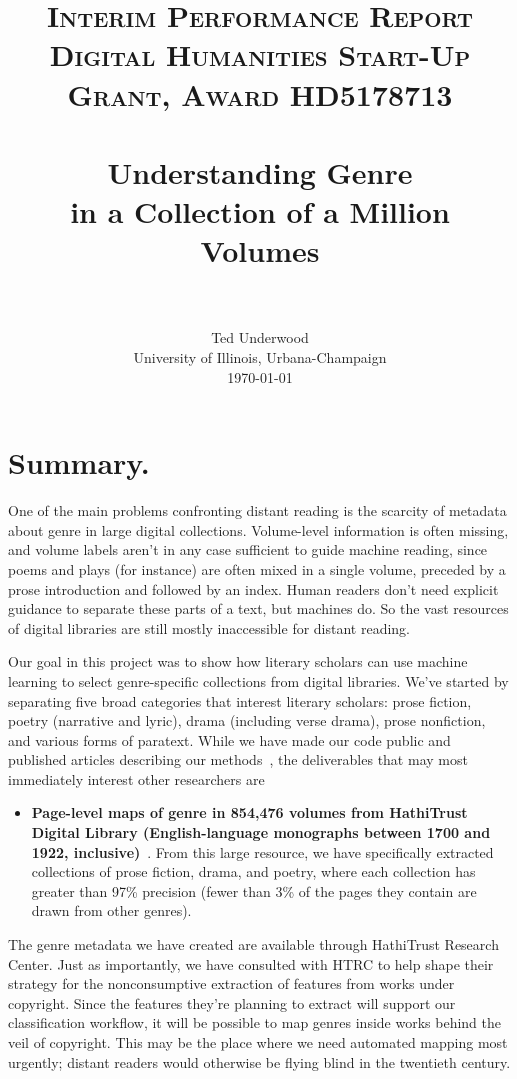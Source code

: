 \documentclass[paper=a4, fontsize=12pt]{scrartcl}
\title{
		\usefont{OT1}{bch}{b}{n}
		\normalfont \normalsize \textsc{Interim Performance Report\\Digital Humanities Start-Up Grant, Award HD5178713} \\ [25pt]
		\horrule{0.5pt} \\[0.4cm]
		\huge Understanding Genre\\in a Collection of a Million Volumes \\
		\horrule{2pt} \\[0.5cm]
}
\author{
        Ted Underwood\\University of Illinois, Urbana-Champaign\\	
        \today
}
\date{}
\numberwithin{equation}{section}		%
\numberwithin{figure}{section}			%
\numberwithin{table}{section}				%
\begin{document}
\maketitle
\thispagestyle{empty}
\newpage
\setcounter{page}{1}
\normalsize
{}
\tableofcontents
\newpage
\section{Summary.} 
One of the main problems confronting distant reading is the scarcity of metadata about genre in large digital collections. Volume-level information is often missing, and volume labels aren't in any case sufficient to guide machine reading, since poems and plays (for instance) are often mixed in a single volume, preceded by a prose introduction and followed by an index. Human readers don't need explicit guidance to separate these parts of a text, but machines do. So the vast resources of digital libraries are still mostly inaccessible for distant reading.

Our goal in this project was to show how literary scholars can use machine learning to select genre-specific collections from digital libraries. We've started by separating five broad categories that interest literary scholars: prose fiction, poetry (narrative and lyric), drama (including verse drama), prose nonfiction, and various forms of paratext. While we have made our code public and published articles describing our methods~\cite{underwood:mutable, underwood:blurry, underwood:slate, underwood:genrerepo}, the deliverables that may most immediately interest other researchers are
\begin{itemize}
\item \textbf{Page-level maps of genre in 854,476 volumes from HathiTrust Digital Library (English-language monographs between 1700 and 1922, inclusive)}~\cite{underwood:pages}. From this large resource, we have specifically extracted collections of prose fiction, drama, and poetry, where each collection has greater than 97\% precision (fewer than 3\% of the pages they contain are drawn from other genres).
\end{itemize}

The genre metadata we have created are available through HathiTrust Research Center. Just as importantly, we have consulted with HTRC to help shape their strategy for the nonconsumptive extraction of features from works under copyright. Since the features they're planning to extract will support our classification workflow, it will be possible to map genres inside works behind the veil of copyright. This may be the place where we need automated mapping most urgently; distant readers would otherwise be flying blind in the twentieth century.
\end{document}

